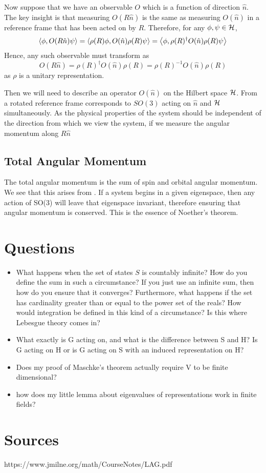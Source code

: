 \documentclass[a4paper]{article}
\begin{document}
Now suppose that we have an observable $O$ which is a function of direction $\hat{n}$. The key insight is that measuring $O(R\hat{n})$ is the same as measuring $O(\hat{n})$ in a reference frame that has been acted on by $R$. Therefore, for any $\phi, \psi \in \mathcal{H}$, 
$$\left\langle \phi , O(R\hat{n})\psi \right\rangle = \left\langle \rho(R)\phi , O(\hat{n})\rho(R)\psi \right\rangle= \left\langle \phi , \rho(R)^\dagger O(\hat{n})\rho(R)\psi \right\rangle$$
Hence, any such observable must transform as  
$$O(R\hat{n}) = \rho(R)^\dagger O(\hat{n})\rho(R) = \rho(R)^{-1} O(\hat{n})\rho(R)$$
as $\rho$ is a unitary representation.

Then we will need to describe an operator $O(\hat{n})$ on the Hilbert space $\mathcal{H}$. From a rotated reference frame corresponds to $SO(3)$ acting on $\hat{n}$ and $\mathcal{H}$ simultaneously. As the physical properties of the system should be independent of the direction from which we view the system, if we measure the angular momentum along $R\hat{n}$

\subsection{Total Angular Momentum}
The total angular momentum is the sum of spin and orbital angular momentum. We see that this arises from . If a system begins in a given eigenspace, then any action of SO(3) will leave that eigenspace invariant, therefore ensuring that angular momentum is conserved. This is the essence of Noether's theorem.

\section{Questions}
\begin{itemize}
    \item What happens when the set of states $S$ is countably infinite? How do you define the sum in such a circumstance? If you just use an infinite sum, then how do you ensure that it converges? Furthermore, what happens if the set has cardinality greater than or equal to the power set of the reals? How would integration be defined in this kind of a circumstance? Is this where Lebesgue theory comes in?
    \item What exactly is G acting on, and what is the difference between S and H? Is G acting on H or is G acting on S with an induced representation on H?
    \item Does my proof of Maschke's theorem actually require V to be finite dimensional?
    \item how does my little lemma about eigenvalues of representations work in finite fields?
\end{itemize}

\section{Sources}


https://www.jmilne.org/math/CourseNotes/LAG.pdf
\end{document}

